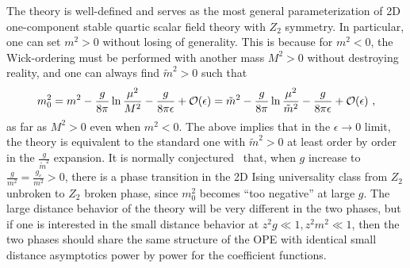 \documentclass[a4paper,11pt]{article}
\begin{document}
The theory is well-defined and serves as the most general parameterization of 2D one-component stable quartic scalar field theory with $Z_2$ symmetry. In particular, one can set $m^2>0$ without losing of generality. This is because for $m^2<0$, the Wick-ordering must be performed with another mass $M^2>0$ without destroying reality, and one can always find $\tilde m^2>0$ such that
\begin{align}
m_0^2=m^2-\frac{g}{8\pi}\ln \frac{\mu^2}{M^2}-\frac{g}{8\pi \epsilon}+{\cal O}(\epsilon)=\tilde m^2-\frac{g}{8\pi}\ln \frac{\mu^2}{\tilde m^2}-\frac{g}{8\pi \epsilon}+{\cal O}(\epsilon) \ ,
\end{align}
as far as $M^2>0$ even when $m^2<0$. The above implies that in the $\epsilon \rightarrow 0$ limit, the theory is equivalent to the standard one with $\tilde m^2>0$ at least order by order in the $\frac{g}{\tilde m^2}$ expansion. It is normally conjectured~\cite{Chang:1976ek} that,  when $g$ increase to $\frac{g}{m^2}=\frac{g_c}{m^2}>0$, there is a phase transition in the 2D Ising universality class from $Z_2$ unbroken to $Z_2$ broken phase, since $m_0^2$ becomes ``too negative'' at large $g$. The large distance behavior of the theory will be very different in the two phases, but if one is interested in the small distance behavior at $z^2g\ll 1, z^2m^2\ll 1$, then the two phases should share the same structure of the OPE with identical small distance asymptotics power by power for the coefficient functions. 
\end{document}
